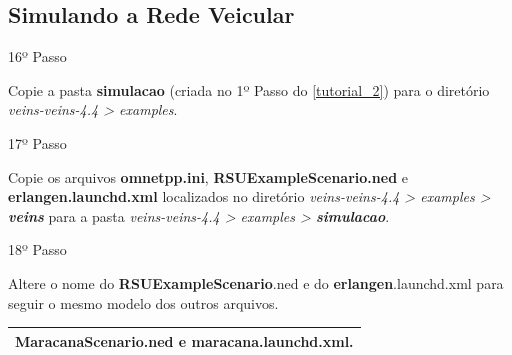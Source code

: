 \documentclass[
12pt,				%
openright,			%
oneside,			%
a4paper,			%
brazil,				%
]{abntex2}
\begin{document}
{\begin{anexosenv}
        	\section{Simulando a Rede Veicular}
        	
            	\begin{description}
                    \item[16º Passo]
                \end{description}
                \par Copie a pasta \textbf{simulacao} (criada no 1º Passo do \autoref{tutorial_2}) para o diretório \textit{veins-veins-4.4 > examples}. %
                
        	
            	\begin{description}
                    \item[17º Passo]
                \end{description}
                \par Copie os arquivos \textbf{omnetpp.ini}, \textbf{RSUExampleScenario.ned} e \textbf{erlangen.launchd.xml} localizados no diretório \textit{veins-veins-4.4 > examples > \textbf{veins}} para a pasta \textit{veins-veins-4.4 > examples > \textbf{simulacao}}.
                
        	
            	\begin{description}
                    \item[18º Passo]
                \end{description}
                \par Altere o nome do \textbf{RSUExampleScenario}.ned e do \textbf{erlangen}.launchd.xml para seguir o mesmo modelo dos outros arquivos.
                
	            \begin{table}[H]
		            \renewcommand{\arraystretch}{1.5}
	                \begin{tabular}{|p{15.5cm}|}
		                \hline
                        \textbf{MaracanaScenario}.ned e \textbf{maracana}.launchd.xml. \\
		                \hline
		            \end{tabular}
	            \end{table}
                
        	

\end{anexosenv}}
\end{document}

